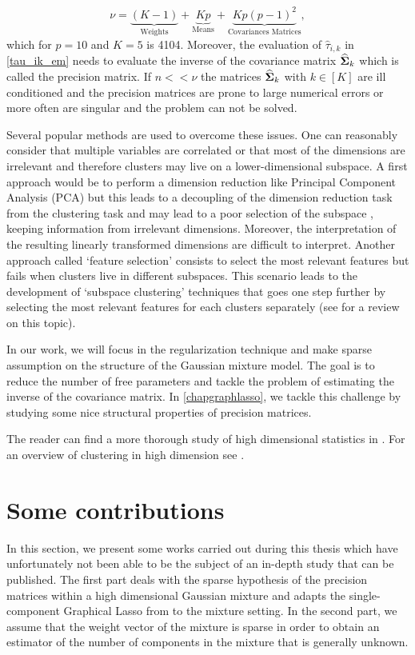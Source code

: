 \begin{equation}
   \nu = \underbrace{(K-1)}_\text{Weights}+ \underbrace{Kp}_\text{Means} + \underbrace{Kp(p-1)^2}_\text{Covariances Matrices},
 \end{equation}
which for $p=10$ and $K=5$ is 4104. Moreover, the evaluation of $\hat\tau_{i,k}$ in \cref{tau_ik_em} needs to evaluate the inverse of the covariance matrix $\widehat{\boldsymbol\Sigma}_k$ which is called the precision matrix. If $n<<\nu$ the matrices $\widehat{\boldsymbol\Sigma}_k$ with $ k\in[K]$ are ill conditioned and the precision matrices are prone to large numerical errors or more often are singular and the problem can not be solved.

Several popular methods are used to overcome these issues. One can reasonably consider that multiple variables are correlated or that most of the dimensions are irrelevant and therefore clusters may live on a lower-dimensional subspace. A first approach would be to perform a dimension reduction like Principal Component Analysis (PCA) but this leads to a decoupling of the dimension reduction task from the clustering task and may lead to a poor selection of the subspace \citep{bouveyron:hal-00750909}, keeping information from irrelevant dimensions. Moreover, the interpretation of the resulting linearly transformed dimensions are difficult to interpret. Another approach called `feature selection' consists to select the most relevant features but fails when clusters live in different subspaces. This scenario leads to the development of `subspace clustering' techniques that goes one step further by selecting the most relevant features for each clusters separately (see \citep{Parsons:2004:SCH:1007730.1007731} for a review on this topic). 

In our work, we will focus in the regularization technique and make sparse assumption on the structure of the Gaussian mixture model. The goal is to reduce the number of free parameters and tackle the problem of estimating the inverse of the covariance matrix. In \cref{chapgraphlasso}, we tackle this challenge by studying some nice structural properties of precision matrices.

The reader can find a more thorough study of high dimensional statistics in \cite{giraud2014introduction,Zimek2012}. For an overview of clustering in high dimension see \citep{bouveyron:hal-00750909,Parsons:2004:SCH:1007730.1007731}.
\section{Some contributions}
In this section, we present some works carried out during this thesis which have unfortunately not been able to be the subject of an in-depth study that can be published. The first part deals with the sparse hypothesis of the precision matrices within a high dimensional Gaussian mixture and adapts the single-component Graphical Lasso from \citep{glasso07} to the mixture setting. In the second part, we assume that the weight vector of the mixture is sparse in order to obtain an estimator of the number of components in the mixture that is generally unknown. 


